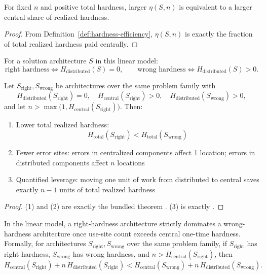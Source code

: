 \begin{proposition}\label{prop:hardness-efficiency-interpretation}
For fixed $n$ and positive total hardness, larger $\eta(S,n)$ is equivalent to a larger central share of realized hardness.
\end{proposition}

\begin{proof}
From Definition~\ref{def:hardness-efficiency}, $\eta(S,n)$ is exactly the fraction of total realized hardness paid centrally.
\end{proof}

\begin{definition}\label{def:right-wrong-placement}
For a solution architecture $S$ in this linear model:
\[
\text{right hardness} \iff H_{\mathrm{distributed}}(S)=0,\qquad
\text{wrong hardness} \iff H_{\mathrm{distributed}}(S)>0.
\]
\end{definition}

\begin{theorem}\label{thm:centralization-dominance}
Let $S_{\mathrm{right}}, S_{\mathrm{wrong}}$ be architectures over the same problem family with
\[
H_{\mathrm{distributed}}(S_{\mathrm{right}})=0,\quad
H_{\mathrm{central}}(S_{\mathrm{right}})>0,\quad
H_{\mathrm{distributed}}(S_{\mathrm{wrong}})>0,
\]
and let $n > \max\!\bigl(1, H_{\mathrm{central}}(S_{\mathrm{right}})\bigr)$. Then:
\begin{enumerate}
\item Lower total realized hardness:
\[
H_{\text{total}}(S_{\mathrm{right}}) < H_{\text{total}}(S_{\mathrm{wrong}})
\]
\item Fewer error sites: errors in centralized components affect 1 location; errors in distributed components affect $n$ locations
\item Quantified leverage: moving one unit of work from distributed to central saves exactly $n-1$ units of total realized hardness
\end{enumerate}
\end{theorem}

\begin{proof}
(1) and (2) are exactly the bundled theorem
.
(3) is exactly
.
\end{proof}

\begin{corollary}\label{cor:right-wrong-hardness}
In the linear model, a right-hardness architecture strictly dominates a wrong-hardness architecture once use-site count exceeds central one-time hardness. Formally, for architectures $S_{\mathrm{right}}, S_{\mathrm{wrong}}$ over the same problem family, if $S_{\mathrm{right}}$ has right hardness, $S_{\mathrm{wrong}}$ has wrong hardness, and $n > H_{\mathrm{central}}(S_{\mathrm{right}})$, then
\[
H_{\mathrm{central}}(S_{\mathrm{right}}) + n\,H_{\mathrm{distributed}}(S_{\mathrm{right}})
<
H_{\mathrm{central}}(S_{\mathrm{wrong}}) + n\,H_{\mathrm{distributed}}(S_{\mathrm{wrong}}).
\]
\end{corollary}


